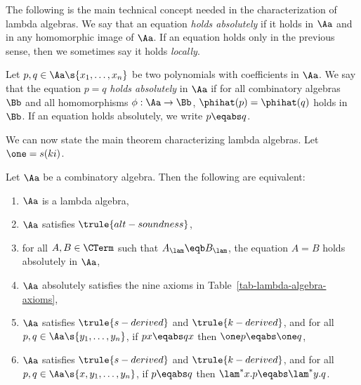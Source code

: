 \documentclass[12pt]{article}
\begin{document}
The following is the main technical concept needed in the
characterization of lambda algebras. We say that an equation {\em
  holds absolutely} if it holds in $\Aa$ and in any homomorphic image
of $\Aa$. If an equation holds only in the previous sense, then we
sometimes say it holds {\em locally}.

\begin{definition}
  Let $p,q\in\Aa\s{x_1,\ldots,x_n}$ be two polynomials with
  coefficients in $\Aa$. We say that the equation $p=q$ {\em holds
    absolutely} in $\Aa$ if for all combinatory algebras $\Bb$ and all
  homomorphisms $\phi:\Aa\to\Bb$, $\phihat(p)=\phihat(q)$ holds in $\Bb$.
  If an equation holds absolutely, we write $p\eqabs q$.
\end{definition}

We can now state the main theorem characterizing lambda algebras. Let
$\one=s(ki)$.

\begin{theorem}\label{thm-tfae-lambda-algebra}
  Let $\Aa$ be a combinatory algebra. Then the following are equivalent:
  \begin{enumerate}
  \item $\Aa$ is a lambda algebra,
  \item $\Aa$ satisfies $\trule{alt-soundness}$,
  \item for all $A,B\in\CTerm$ such that $ A_\lam \eqb B_\lam$, 
    the equation $A=B$ holds absolutely in $\Aa$,
  \item $\Aa$ absolutely satisfies the nine axioms in
    Table~\ref{tab-lambda-algebra-axioms},
  \item $\Aa$ satisfies $\trule{s-derived}$ and $\trule{k-derived}$,
    and for all $p,q\in\Aa\s{y_1,\ldots,y_n}$, if $px\eqabs qx$ then
    $\one p\eqabs \one q$,
  \item\label{thm-tfae-lambda-algebra6} $\Aa$ satisfies
    $\trule{s-derived}$ and $\trule{k-derived}$, and for all
    $p,q\in\Aa\s{x,y_1,\ldots,y_n}$, if $p\eqabs q$ then
    $\lam^*x.p\eqabs \lam^*y.q$.
  \end{enumerate}
\end{theorem}
\end{document}
